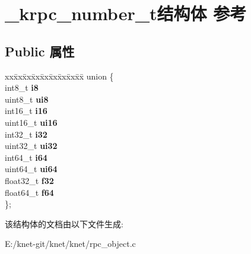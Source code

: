 \hypertarget{struct__krpc__number__t}{}\section{\+\_\+krpc\+\_\+number\+\_\+t结构体 参考}
\label{struct__krpc__number__t}
\subsection*{Public 属性}
\begin{DoxyCompactItemize}
\item 
\hypertarget{struct__krpc__number__t_adface820fba4bf12ac123fb1eb69a64d}{}\begin{tabbing}
xx\=xx\=xx\=xx\=xx\=xx\=xx\=xx\=xx\=\kill
union \{\\
\>int8\_t {\bfseries i8}\\
\>uint8\_t {\bfseries ui8}\\
\>int16\_t {\bfseries i16}\\
\>uint16\_t {\bfseries ui16}\\
\>int32\_t {\bfseries i32}\\
\>uint32\_t {\bfseries ui32}\\
\>int64\_t {\bfseries i64}\\
\>uint64\_t {\bfseries ui64}\\
\>float32\_t {\bfseries f32}\\
\>float64\_t {\bfseries f64}\\
\}; \label{struct__krpc__number__t_adface820fba4bf12ac123fb1eb69a64d}
\\

\end{tabbing}\end{DoxyCompactItemize}


该结构体的文档由以下文件生成\+:\begin{DoxyCompactItemize}
\item 
E\+:/knet-\/git/knet/knet/rpc\+\_\+object.\+c\end{DoxyCompactItemize}
